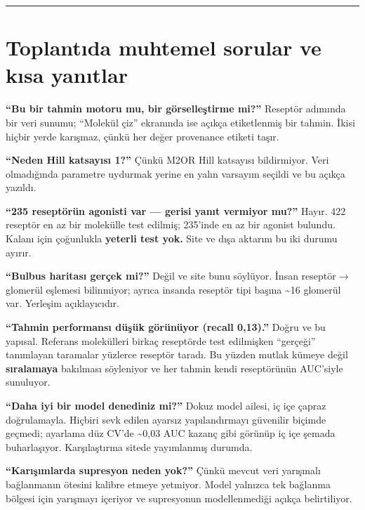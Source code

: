 \documentclass[11pt,a4paper]{article}
\begin{document}
\vspace{0.4\baselineskip}
\hrule
\vspace{0.9\baselineskip}


\section{Toplantıda muhtemel sorular ve kısa yanıtlar}

\textbf{``Bu bir tahmin motoru mu, bir görselleştirme mi?''} Reseptör adımında bir veri sunumu; ``Molekül çiz'' ekranında ise açıkça etiketlenmiş bir tahmin. İkisi hiçbir yerde karışmaz, çünkü her değer provenance etiketi taşır.

\textbf{``Neden Hill katsayısı 1?''} Çünkü M2OR Hill katsayısı bildirmiyor. Veri olmadığında parametre uydurmak yerine en yalın varsayım seçildi ve bu açıkça yazıldı.

\textbf{``235 reseptörün agonisti var — gerisi yanıt vermiyor mu?''} Hayır. 422 reseptör en az bir molekülle test edilmiş; 235'inde en az bir agonist bulundu. Kalanı için çoğunlukla \textbf{yeterli test yok.} Site ve dışa aktarım bu iki durumu ayırır.

\textbf{``Bulbus haritası gerçek mi?''} Değil ve site bunu söylüyor. İnsan reseptör\(\rightarrow\)glomerül eşlemesi bilinmiyor; ayrıca insanda reseptör tipi başına \textasciitilde{}16 glomerül var. Yerleşim açıklayıcıdır.

\textbf{``Tahmin performansı düşük görünüyor (recall 0,13).''} Doğru ve bu yapısal. Referans molekülleri birkaç reseptörde test edilmişken ``gerçeği'' tanımlayan taramalar yüzlerce reseptör taradı. Bu yüzden mutlak kümeye değil \textbf{sıralamaya} bakılması söyleniyor ve her tahmin kendi reseptörünün AUC'siyle sunuluyor.

\textbf{``Daha iyi bir model denediniz mi?''} Dokuz model ailesi, iç içe çapraz doğrulamayla. Hiçbiri sevk edilen ayarsız yapılandırmayı güvenilir biçimde geçmedi; ayarlama düz CV'de \textasciitilde{}0,03 AUC kazanç gibi görünüp iç içe şemada buharlaşıyor. Karşılaştırma sitede yayımlanmış durumda.

\textbf{``Karışımlarda supresyon neden yok?''} Çünkü mevcut veri yarışmalı bağlanmanın ötesini kalibre etmeye yetmiyor. Model yalnızca tek bağlanma bölgesi için yarışmayı içeriyor ve supresyonun modellenmediği açıkça belirtiliyor.
\end{document}
